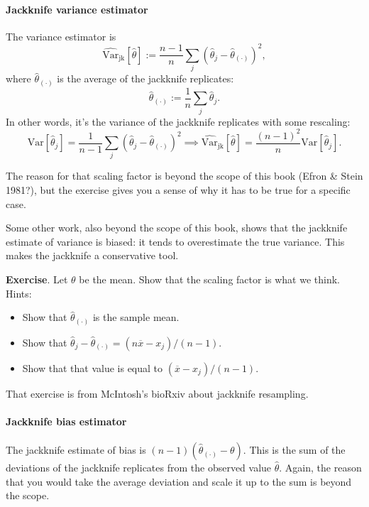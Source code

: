\documentclass{book}
\providecommand{\tightlist}{%
  \setlength{\itemsep}{0pt}\setlength{\parskip}{0pt}}
\begin{document}
\paragraph{Jackknife variance
estimator}\label{jackknife-variance-estimator}

The variance estimator is \[
\widehat{\mathrm{Var}}_\mathrm{jk}[\hat{\theta}] := \frac{n-1}{n}  \sum_j \left( \hat{\theta}_j - \hat{\theta}_{(\cdot)} \right)^2,
\] where \(\hat{\theta}_{(\cdot)}\) is the average of the jackknife
replicates: \[
\hat{\theta}_{(\cdot)} := \frac{1}{n} \sum_j \hat{\theta}_j.
\] In other words, it's the variance of the jackknife replicates with
some rescaling: \[
\mathrm{Var}[\hat{\theta}_j] = \frac{1}{n-1} \sum_j \left( \hat{\theta}_j - \hat{\theta}_{(\cdot)} \right)^2 \implies
  \widehat{\mathrm{Var}}_\mathrm{jk}[\hat{\theta}] = \frac{(n-1)^2}{n} \mathrm{Var}[\hat{\theta}_j].
\]

The reason for that scaling factor is beyond the scope of this book
(Efron \& Stein 1981?), but the exercise gives you a sense of why it has
to be true for a specific case.

Some other work, also beyond the scope of this book, shows that the
jackknife estimate of variance is biased: it tends to overestimate the
true variance. This makes the jackknife a conservative tool.

\textbf{Exercise}. Let \(\theta\) be the mean. Show that the scaling
factor is what we think. Hints:

\begin{itemize}
\tightlist
\item
  Show that \(\hat{\theta}_{(\cdot)}\) is the sample mean.
\item
  Show that
  \(\hat{\theta}_j - \hat{\theta}_{(\cdot)} = (n \overline{x} - x_j) / (n - 1)\).
\item
  Show that that value is equal to \((\overline{x} - x_j) / (n - 1)\).
\end{itemize}

That exercise is from McIntosh's bioRxiv about jackknife resampling.

\paragraph{Jackknife bias estimator}\label{jackknife-bias-estimator}

The jackknife estimate of bias is
\((n-1) \left( \hat{\theta}_{(\cdot)} - \theta \right)\). This is the
sum of the deviations of the jackknife replicates from the observed
value \(\hat{\theta}\). Again, the reason that you would take the
average deviation and scale it up to the sum is beyond the scope.
\end{document}
